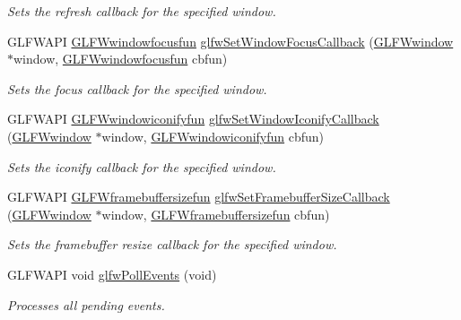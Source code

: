 \begin{DoxyCompactItemize}
\begin{DoxyCompactList}\small\item\em Sets the refresh callback for the specified window. \end{DoxyCompactList}\item 
G\+L\+F\+W\+A\+PI \hyperlink{group__window_ga58be2061828dd35080bb438405d3a7e2}{G\+L\+F\+Wwindowfocusfun} \hyperlink{group__window_gac89c6534ba7fbab6f6c68b855656c0d4}{glfw\+Set\+Window\+Focus\+Callback} (\hyperlink{group__window_ga3c96d80d363e67d13a41b5d1821f3242}{G\+L\+F\+Wwindow} $\ast$window, \hyperlink{group__window_ga58be2061828dd35080bb438405d3a7e2}{G\+L\+F\+Wwindowfocusfun} cbfun)
\begin{DoxyCompactList}\small\item\em Sets the focus callback for the specified window. \end{DoxyCompactList}\item 
G\+L\+F\+W\+A\+PI \hyperlink{group__window_gad2d4e4c3d28b1242e742e8268b9528af}{G\+L\+F\+Wwindowiconifyfun} \hyperlink{group__window_ga17cd86946117b56c76397530900519db}{glfw\+Set\+Window\+Iconify\+Callback} (\hyperlink{group__window_ga3c96d80d363e67d13a41b5d1821f3242}{G\+L\+F\+Wwindow} $\ast$window, \hyperlink{group__window_gad2d4e4c3d28b1242e742e8268b9528af}{G\+L\+F\+Wwindowiconifyfun} cbfun)
\begin{DoxyCompactList}\small\item\em Sets the iconify callback for the specified window. \end{DoxyCompactList}\item 
G\+L\+F\+W\+A\+PI \hyperlink{group__window_ga3e218ef9ff826129c55a7d5f6971a285}{G\+L\+F\+Wframebuffersizefun} \hyperlink{group__window_gad766bcdb4465f9c6c62e5d8ca7cfba56}{glfw\+Set\+Framebuffer\+Size\+Callback} (\hyperlink{group__window_ga3c96d80d363e67d13a41b5d1821f3242}{G\+L\+F\+Wwindow} $\ast$window, \hyperlink{group__window_ga3e218ef9ff826129c55a7d5f6971a285}{G\+L\+F\+Wframebuffersizefun} cbfun)
\begin{DoxyCompactList}\small\item\em Sets the framebuffer resize callback for the specified window. \end{DoxyCompactList}\item 
G\+L\+F\+W\+A\+PI void \hyperlink{group__window_ga872d16e4c77f58c0436f356255920cfc}{glfw\+Poll\+Events} (void)
\begin{DoxyCompactList}\small\item\em Processes all pending events. \end{DoxyCompactList}\item 

\end{DoxyCompactItemize}
